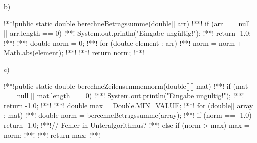 \begin{frame}[fragile,c]{b)~}
\begin{plainjava}[lineskip=2pt]
!**!public static double berechneBetragssumme(double[] arr) {
!**!    if (arr == null || arr.length == 0) {
!**!        System.out.println("Eingabe ungültig!");
!**!        return -1.0;
!**!    }
!**!    double norm = 0;
!**!    for (double element : arr) {
!**!        norm = norm + Math.abs(element);
!**!    }
!**!    return norm;
!**!}
\end{plainjava}
\end{frame}

\begin{frame}[fragile,c]{c)~}
\begin{plainjava}[lineskip=2pt]
!**!public static double berechneZeilensummennorm(double[][] mat) {
!**!    if (mat == null || mat.length == 0) {
!**!        System.out.println("Eingabe ungültig!");
!**!        return -1.0;
!**!    }
!**!    double max = Double.MIN_VALUE;
!**!    for (double[] array : mat) {
!**!        double norm = berechneBetragssumme(array);
!**!        if (norm == -1.0) return -1.0; !**!// Fehler in Unteralgorithmus?
!**!        else if (norm > max) max = norm;
!**!    }
!**!    return max;
!**!}
\end{plainjava}
\end{frame}


